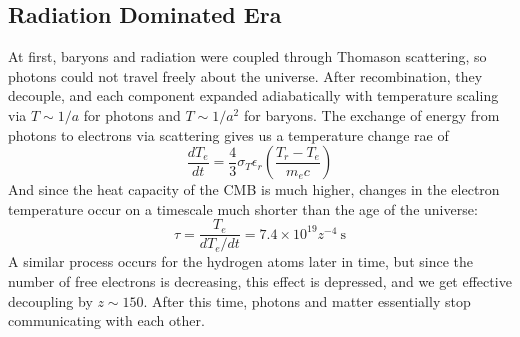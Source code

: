 \documentclass[10pt]{article}
\numberwithin{equation}{section}
\begin{document}
	\subsection{Radiation Dominated Era} %
	\label{sub:radiation_dominated_era}
	At first, baryons and radiation were coupled through Thomason scattering, so photons could not travel freely about the universe. After recombination, they decouple, and each component expanded adiabatically with temperature scaling via $T\sim 1/a$ for photons and $T\sim 1/a^2$ for baryons. The exchange of energy from photons to electrons via scattering gives us a temperature change rae of
	\begin{equation}
		\label{eq:radiation:1} \frac{dT_e}{dt} = \frac{4}{3}\sigma_T\epsilon_r\left(\frac{T_r-T_e}{m_ec}\right)
	\end{equation}
	And since the heat capacity of the CMB is much higher, changes in the electron temperature occur on a timescale much shorter than the age of the universe:
	\begin{equation}
		\label{eq:radiation:2} \tau = \frac{T_e}{dT_e/dt} = 7.4\times 10^{19}z^{-4}\ \mathrm{s}
	\end{equation}
	A similar process occurs for the hydrogen atoms later in time, but since the number of free electrons is decreasing, this effect is depressed, and we get effective decoupling by $z\sim 150$. After this time, photons and matter essentially stop communicating with each other.
\end{document}
